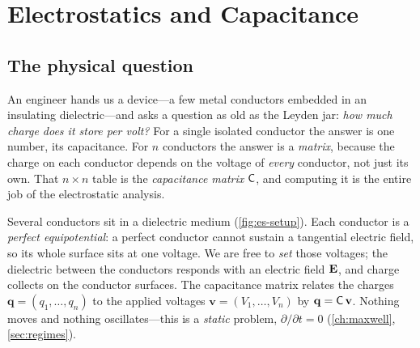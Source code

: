 \chapter{Electrostatics and Capacitance}
\label{ch:electrostatics}


\section{The physical question}
\label{sec:es-question}

An engineer hands us a device---a few metal conductors embedded in an insulating
dielectric---and asks a question as old as the Leyden jar: \emph{how much charge
does it store per volt?} For a single isolated conductor the answer is one number,
its capacitance. For $n$ conductors the answer is a \emph{matrix}, because the
charge on each conductor depends on the voltage of \emph{every} conductor, not
just its own. That $n\times n$ table is the \emph{capacitance matrix}
$\mathsf{C}$, and computing it is the entire job of the electrostatic analysis.

\begin{physicsbox}
Several conductors sit in a dielectric medium (\cref{fig:es-setup}). Each
conductor is a \emph{perfect equipotential}: a perfect conductor cannot sustain a
tangential electric field, so its whole surface sits at one voltage. We are free
to \emph{set} those voltages; the dielectric between the conductors responds with
an electric field $\mathbf{E}$, and charge collects on the conductor surfaces. The
capacitance matrix relates the charges $\mathbf q=(q_1,\dots,q_n)$ to the applied
voltages $\mathbf v=(V_1,\dots,V_n)$ by $\mathbf q = \mathsf{C}\,\mathbf v$. Nothing
moves and nothing oscillates---this is a \emph{static} problem,
$\partial/\partial t=0$ (\cref{ch:maxwell}, \cref{sec:regimes}).
\end{physicsbox}

